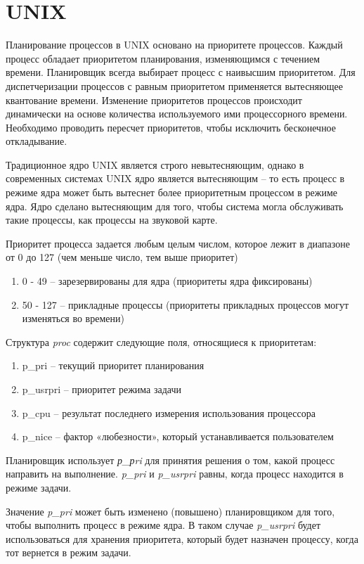 \section{UNIX}

Планирование процессов в UNIX основано на приоритете процессов. Каждый процесс обладает приоритетом планирования, изменяющимся с течением времени. Планировщик всегда выбирает процесс с наивысшим приоритетом. Для диспетчеризации процессов с равным приоритетом применяется вытесняющее квантование времени. Изменение приоритетов процессов происходит динамически на основе количества используемого ими процессорного времени. Необходимо проводить пересчет приоритетов, чтобы исключить бесконечное откладывание.

Традиционное ядро UNIX является строго невытесняющим, однако в современных системах UNIX ядро является вытесняющим -- то есть процесс в режиме ядра может быть вытеснет более приоритетным процессом в режиме ядра. Ядро сделано вытесняющим для того, чтобы система могла обслуживать такие процессы, как процессы на звуковой карте. 

Приоритет процесса задается любым целым числом, которое лежит в диапазоне от 0 до 127 (чем меньше число, тем выше приоритет)
\begin{enumerate}
	\item 0 - 49 -- зарезервированы для ядра (приоритеты ядра фиксированы)
	\item 50 - 127 -- прикладные процессы (приоритеты прикладных процессов могут изменяться во времени)
\end{enumerate}

Структура \textit{proc} содержит следующие поля, относящиеся к приоритетам:
\begin{enumerate}
	\item p\_pri -- текущий приоритет планирования
	\item p\_usrpri -- приоритет режима задачи
	\item p\_cpu -- результат последнего измерения использования процессора
	\item p\_nice -- фактор «любезности»‎, который устанавливается пользователем
\end{enumerate}

Планировщик использует \textit{р\_рri} для принятия решения о том, какой процесс направить на выполнение. \textit{p\_pri} и \textit{p\_usrpri} равны, когда процесс находится в режиме задачи.

Значение \textit{p\_pri} может быть изменено (повышено) планировщиком для того, чтобы выполнить процесс в режиме ядра. В таком случае \textit{p\_usrpri} будет использоваться для хранения приоритета, который будет назначен процессу, когда тот вернется в режим задачи.

